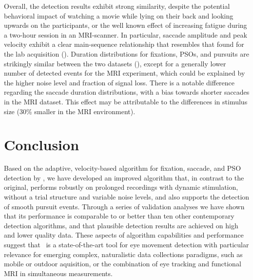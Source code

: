 Overall, the detection results exhibit strong similarity, despite the potential
behavioral impact of watching a movie while lying on their back and looking
upwards on the participants, or the well known effect of increasing fatigue
during a two-hour session in an MRI-scanner. In particular, saccade amplitude
and peak velocity exhibit a clear main-sequence relationship that resembles
that found for the lab acquisition (). Duration distributions
for fixations, PSOs, and pursuits are strikingly similar between the two
datasets (), except for a generally lower number of detected events
for the MRI experiment, which could be explained by the higher noise level and
fraction of signal loss. There is a notable difference regarding the saccade
duration distributions, with a bias towards shorter saccades in the MRI
dataset. This effect may be attributable to the differences in stimulus size
(30\% smaller in the MRI environment).


\section*{Conclusion}\label{con}

Based on the adaptive, velocity-based algorithm for fixation, saccade, and PSO
detection by \cite{Nystrom2010AnData}, we have developed an improved algorithm
that, in contrast to the original, performs robustly on prolonged recordings
with dynamic stimulation, without a trial structure and variable noise levels,
and also supports the detection of smooth pursuit events. Through a series of
validation analyses we have shown that its performance is comparable to or
better than ten other contemporary detection algorithms, and that plausible
detection results are achieved on high and lower quality data.
These aspects of algorithm capabilities and performance suggest that \remodnav\
is a state-of-the-art tool for eye movement detection with particular relevance
for emerging complex, naturalistic data collections paradigms, such as
mobile or outdoor aquisition, or the combination of eye tracking and functional
MRI in simultaneous measurements.

